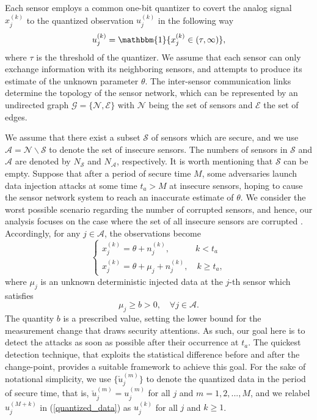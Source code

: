 \documentclass[11pt, draftclsnofoot, onecolumn]{IEEEtran}
\newcommand{\cG}{\mathcal{G}}
\newcommand{\cE}{\mathcal{E}}
\newcommand{\cA}{\mathcal{A}}
\newcommand{\cN}{\mathcal{N}}
\newcommand{\cS}{\mathcal{S}}
\newcommand{\bone}{\mathbbm{1}}
\begin{document}
Each sensor employs a common one-bit quantizer to covert the analog signal $x_j^{\left( k \right)} $ to the quantized observation $u_j^{\left( k \right)} $ in the   following way  
\begin{equation} \label{quantized_data}
u_j^{\left( k \right)}  = {\bone}\{x_j^{\left( k \right)}  \in (\tau, \infty)\},
\end{equation}
where $\tau$ is the threshold of the quantizer.  We assume that each sensor   can only    exchange information with its neighboring sensors, and attempts to  produce its estimate of the unknown parameter $\theta$. The inter-sensor communication links determine the topology of the sensor network, which can be represented by an undirected graph $\cG = \{ \cN,  \cE \}$  with $\cN$ being the set of sensors and $\cE$ the set of edges. 

We assume that there exist a subset $\cS$ of sensors which are secure, and we use $\cA = \cN \backslash \cS$ to denote the set of insecure sensors. The numbers of sensors in $\cS$ and $\cA$ are denoted by $N_{\cS}$ and $N_{\cA}$, respectively. It is worth mentioning that $\cS$ can be empty. Suppose that after a period of secure time $M$, some adversaries launch data injection attacks at some time $t_a>M$ at insecure sensors, hoping to cause the sensor network system to reach an inaccurate estimate of $\theta$. We consider the worst possible scenario regarding the number of corrupted sensors, and hence, our analysis focuses on the case where the set  of all insecure sensors are corrupted \cite{bayraktar2016efficient}. Accordingly, 
  for any $j \in \cA$, the observations become  
\begin{equation}
\left\{ \begin{array}{l}
x_j^{\left( k \right)} = \theta  + n_j^{\left( k \right)}, \qquad  \quad k < {t_a}\\
x_j^{\left( k \right)} = \theta  + {\mu _j} + n_j^{\left( k \right)}, \quad k \ge {t_a},
\end{array} \right.
\end{equation}
where $\mu_j$ is an unknown deterministic injected data at the $j$-th sensor which satisfies
\begin{equation} \label{mu_constraint}
\mu_j \ge b >0, \quad \forall j \in \cA.
\end{equation}
The quantity $b$ is a prescribed value, setting the lower bound for the measurement change that draws security attentions. As such, our goal here is to detect the attacks  as soon as possible after their occurrence at $t_a$. The quickest detection technique, that exploits the statistical difference before and after the
change-point, provides a suitable framework to achieve this goal. For the sake of notational simplicity, we use $\{\check{u}_j^{(m)}\}$ to denote the quantized data  in the period of secure time, that is, ${\check{u}}_j^{(m)} = {u}_j^{(m)}$ for all $j$ and $m=1,2,...,M$, and we relabel ${u}_j^{(M+k)}$ in (\ref{quantized_data}) as ${u}_j^{(k)}$  for all $j$ and $k\ge 1$.
\end{document}
